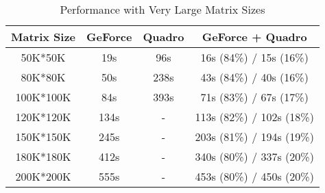 \begin{table}[h]
\caption{Performance with Very Large Matrix Sizes}
\centering
\begin{tabular}{|c|c|c|c|}
\hline
Matrix Size & GeForce & Quadro & GeForce + Quadro \\ \hline
 50K*50K    &    19s  &   96s  &    16s (84\%) /  15s (16\%) \\ \hline
 80K*80K    &    50s  &  238s  &    43s (84\%) /  40s (16\%) \\ \hline
 100K*100K  &    84s  &  393s  &    71s (83\%) /  67s (17\%) \\ \hline
 120K*120K  &   134s  &     -  &   113s (82\%) / 102s (18\%) \\ \hline
 150K*150K  &   245s  &     -  &   203s (81\%) / 194s (19\%) \\ \hline
 180K*180K  &   412s  &     -  &   340s (80\%) / 337s (20\%) \\ \hline
 200K*200K  &   555s  &     -  &   453s (80\%) / 450s (20\%)  \\ \hline
\end{tabular}
\label{tab:hresult}
\vspace{-0.22in}
\end{table}

